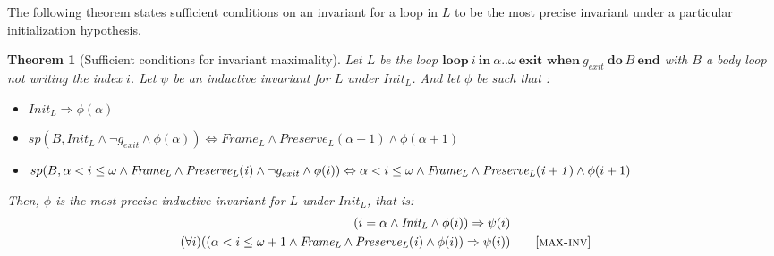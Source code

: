 \documentclass[a4paper,10pt]{article}
\newcommand{\idx}{\ensuremath{i}\xspace}
\newcommand{\idxinitial}{\ensuremath{\alpha}\xspace}
\newcommand{\idxfinal}{\ensuremath{\omega}\xspace}
\newcommand{\KWloop}{\ensuremath{\mathrm{\textbf{loop}}~}}
\newcommand{\KWdo}{\ensuremath{\mathrm{\textbf{do}}~}}
\newcommand{\KWend}{\ensuremath{\mathrm{\textbf{end}}}}
\newcommand{\KWin}{\ensuremath{~\mathrm{\textbf{in}}~}}
\newcommand{\KWexit}{\ensuremath{\mathrm{\textbf{exit when}}~}}
\newcommand{\initcond}[1]{\ensuremath{\mathit{Init_{#1}}}}
\newcommand{\framecond}[1]{\ensuremath{\mathit{Frame_{#1}}}}
\newcommand{\preservecond}[2]{\ensuremath{\mathit{Preserve_{#1}(#2)}}}
\newcommand{\maxinv}{\textsc{max-inv}\xspace}
\newtheorem{theorem}{Theorem}[section]
\newcommand{\spostsym}{\ensuremath{sp}\xspace}
\newcommand{\spost}[2]{\ensuremath{\spostsym(#1,#2)}}
\begin{document}
The following theorem states sufficient conditions on an invariant for
a loop in $L$ to be the most precise invariant under a particular
initialization hypothesis. 

\begin{theorem}[Sufficient conditions for invariant maximality]
\label{lem:precise-inv} 
Let $L$ be the loop \textnormal{$\KWloop  \idx \KWin \idxinitial ..\idxfinal ~
\KWexit g_{exit}~ \KWdo B ~\KWend$} with $B$ a body loop not writing the index \idx.
Let $\psi$ be an inductive invariant for $L$ under \initcond{L}.
And let $\phi$ be such that : 
\begin{itemize}
\item[(a)] $\initcond{L} \Rightarrow \phi(\idxinitial)$ 
\item[(b)] $\spost{B}{\initcond{L} \land \neg g_{exit} \land \phi(\idxinitial)} 
             \Leftrightarrow  
            \framecond{L} \land \preservecond{L}{\idxinitial+1} \land  \phi(\idxinitial+1)$
\item[(c)] $\spost{B}{\idxinitial < \idx \leq \idxfinal \land  \framecond{L} \land \preservecond{L}{\idx} \land \neg g_{exit} \land \phi(\idx)} 
             \Leftrightarrow \\
            \idxinitial < \idx \leq \idxfinal \land \framecond{L} \land \preservecond{L}{\idx+1} \land \phi(\idx+1)$
\end{itemize}
\noindent Then, $\phi$ is the most precise inductive invariant for $L$ under \initcond{L},
that is:
\begin{align*}
(\idx = \idxinitial \land \initcond{L} \land \phi(\idx)) \Rightarrow  \psi(\idx)\\
(\forall \idx) ((\idxinitial < \idx \leq \idxfinal+1 \land \framecond{L} \land \preservecond{L}{\idx} \land \phi(i))
\Rightarrow \psi(i))  & \quad \quad [\maxinv]
\end{align*}
\end{theorem}
\end{document}
